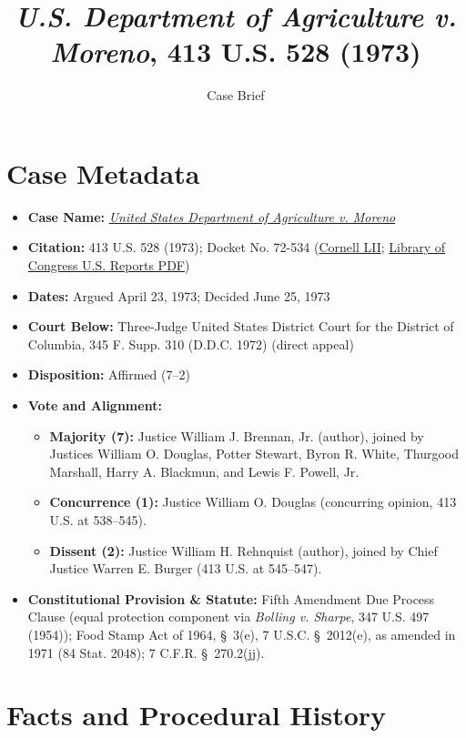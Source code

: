 \documentclass[12pt]{article}
\title{\textit{U.S. Department of Agriculture v. Moreno}, 413 U.S. 528 (1973)}
\author{Case Brief}
\date{}
\begin{document}
\maketitle

\section{Case Metadata}

\begin{itemize}
  \item \textbf{Case Name:} \href{https://supreme.justia.com/cases/federal/us/413/528/}{\textit{United States Department of Agriculture v. Moreno}}
  \item \textbf{Citation:} 413 U.S. 528 (1973); Docket No. 72-534 (\href{https://www.law.cornell.edu/supremecourt/text/413/528}{Cornell LII}; \href{https://tile.loc.gov/storage-services/service/ll/usrep/usrep413/usrep413528/usrep413528.pdf}{Library of Congress U.S. Reports PDF})
  \item \textbf{Dates:} Argued April 23, 1973; Decided June 25, 1973
  \item \textbf{Court Below:} Three-Judge United States District Court for the District of Columbia, 345 F. Supp. 310 (D.D.C. 1972) (direct appeal)
  \item \textbf{Disposition:} Affirmed (7--2)
  \item \textbf{Vote and Alignment:}
  \begin{itemize}
    \item \textbf{Majority (7):} Justice William J. Brennan, Jr. (author), joined by Justices William O. Douglas, Potter Stewart, Byron R. White, Thurgood Marshall, Harry A. Blackmun, and Lewis F. Powell, Jr.
    \item \textbf{Concurrence (1):} Justice William O. Douglas (concurring opinion, 413 U.S. at 538--545).
    \item \textbf{Dissent (2):} Justice William H. Rehnquist (author), joined by Chief Justice Warren E. Burger (413 U.S. at 545--547).
  \end{itemize}
  \item \textbf{Constitutional Provision \& Statute:} Fifth Amendment Due Process Clause (equal protection component via \textit{Bolling v. Sharpe}, 347 U.S. 497 (1954)); Food Stamp Act of 1964, \S~3(e), 7 U.S.C. \S~2012(e), as amended in 1971 (84 Stat. 2048); 7 C.F.R. \S~270.2(jj).
\end{itemize}

\section{Facts and Procedural History}
\end{document}
